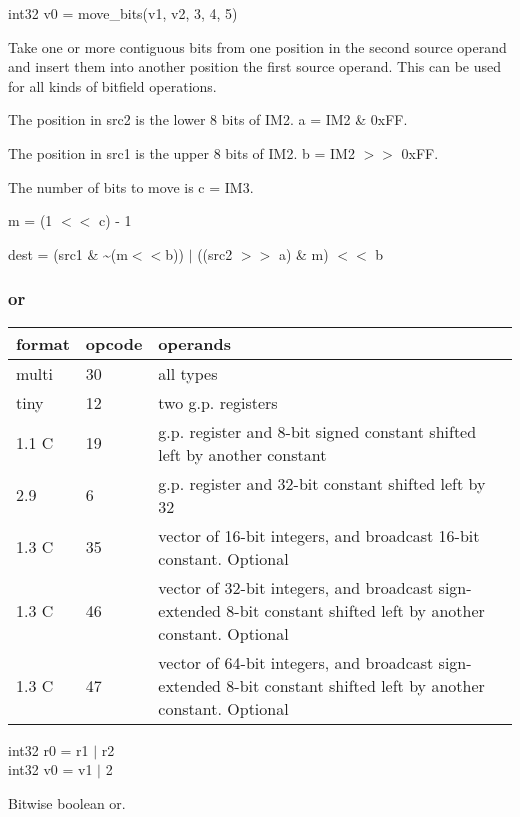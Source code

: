\documentclass[forwardcom.tex]{subfiles}
\begin{document}
int32 v0 = move\_bits(v1, v2, 3, 4, 5) 
\vspace{2mm}

Take one or more contiguous bits from one position in the second source operand and insert them into another position the first source operand. This can be used for all kinds of bitfield operations.
\vspace{2mm}

The position in src2 is the lower 8 bits of IM2. a = IM2 \& 0xFF.

The position in src1 is the upper 8 bits of IM2. b = IM2 $>>$ 0xFF.

The number of bits to move is c = IM3.
\vspace{2mm}

m = (1 $<<$ c) - 1

dest = (src1 \& \~{}(m$<<$b)) $|$ ((src2 $>>$ a) \& m) $<<$ b

\subsubsection{or}
\label{table:orInstruction}
\begin{tabular}{|p{12mm}|p{12mm}|p{110mm}|}
\hline
\bfseries format & \bfseries opcode & \bfseries operands \\ \hline
multi & 30 & all types \\ \hline
tiny  & 12 & two g.p. registers \\ \hline
1.1 C & 19 & g.p. register and 8-bit signed constant shifted left by another constant \\ \hline
2.9   &  6 & g.p. register and 32-bit constant shifted left by 32 \\ \hline
1.3 C & 35 & vector of 16-bit integers, and broadcast 16-bit constant. Optional \\ \hline
1.3 C & 46 & vector of 32-bit integers, and broadcast sign-extended 8-bit constant shifted left by another constant. Optional \\ \hline
1.3 C & 47 & vector of 64-bit integers, and broadcast sign-extended 8-bit constant shifted left by another constant. Optional \\ \hline
\end{tabular}
\vspace{2mm}

int32 r0 = r1 $|$ r2 \\
int32 v0 = v1 $|$ 2
\vspace{2mm}

Bitwise boolean or.
\vspace{2mm}
\end{document}
